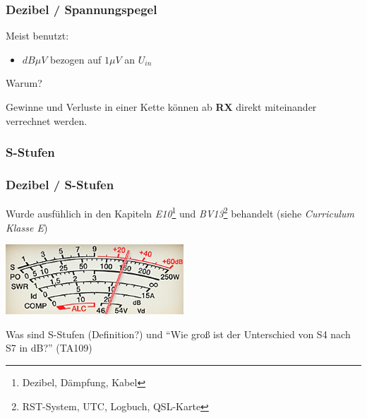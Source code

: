 \begin{frame}
    \frametitle{Dezibel / Spannungspegel}

    Meist benutzt:

    \begin{itemize}
        \item $dB \mu V$ bezogen auf $1 \mu V$ an $U_{in}$
    \end{itemize}

    \begin{center}
        Warum?
    \end{center}

    \pause

    Gewinne und Verluste in einer Kette können ab \textbf{RX} direkt miteinander
    verrechnet werden.

\end{frame}

\subsubsection{S-Stufen}

\begin{frame}
    \frametitle{Dezibel / S-Stufen}

    Wurde ausfühlich in den Kapiteln \emph{E10}\footnote{Dezibel, Dämpfung,
    Kabel} und \emph{BV13}\footnote{RST-System, UTC, Logbuch, QSL-Karte}
    behandelt (siehe \emph{Curriculum Klasse E}\hyperlink{refs}{\cite{curr}})

    \begin{center}
        \includegraphics[width=0.5\textwidth,height=0.2\textheight,keepaspectratio]{e10/S-Meter.jpg}
        \tiny \hyperlink{refs}{\cite{wc}}
    \end{center}


    \begin{exampleblock}{Was sind S-Stufen (Definition?) und ``Wie groß ist der
                         Unterschied von S4 nach S7 in dB?'' (TA109)}
    \end{exampleblock}

\end{frame}


